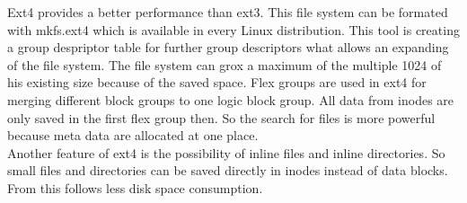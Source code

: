 Ext4 provides a better performance than ext3. 
This file system can be formated with mkfs.ext4 which is available in every Linux distribution.
This tool is creating a group despriptor table for further group descriptors what allows an expanding of the file system. The file system can grox a maximum of the multiple 1024 of his existing size because of the saved space\cite[p.21]{Seufert2015}.
Flex groups are used in ext4 for merging different block groups to one logic block group. All data from inodes are only saved in the first flex group then. 
So the search for files is more powerful because meta data are allocated at one place. \\

Another feature of ext4 is the possibility of inline files and inline directories. So small files and directories can be saved directly in inodes instead of data blocks. From this follows less disk space consumption\cite[p.24]{Seufert2015}.
\Blindtext
